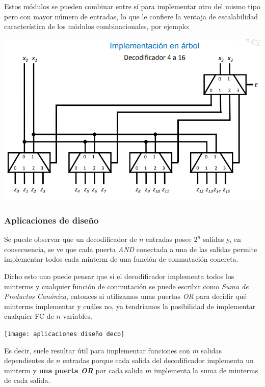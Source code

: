 \documentclass[a4paper,10pt]{book}
\begin{document}
Estos módulos se pueden combinar entre sí para implementar otro del mismo tipo pero con mayor número de entradas, lo que le confiere la ventaja de escalabilidad característica de los módulos combinacionales, por ejemplo:
\begin{center}
\includegraphics[scale=0.65]{Deco16}
\end{center}

\subsubsection*{Aplicaciones de diseño}
Se puede observar que un decodificador de $n$ entradas posee $2^n$ salidas y, en consecuencia, se ve que cada puerta \textit{AND} conectada a una de las salidas permite implementar todos cada minterm de una función de conmutación concreta.\par
Dicho esto uno puede pensar que si el decodificador implementa todos los minterms y cualquier función de conmutación se puede escribir como \textit{Suma de Productos Canónica}, entonces si utilizamos unas puertas \textit{OR} para decidir qué minterms implementar y cuáles no, ya tendríamos la posibilidad de implementar cualquier FC de $n$ variables.

\begin{center}
\texttt{[image: aplicaciones diseño deco]}
\end{center}

Es decir, suele resultar útil para implementar funciones con $m$ salidas dependientes de $n$ entradas porque cada salida del decodificador implementa un minterm y \textbf{una puerta \textit{OR}} por cada salida $m$ implementa la suma de minterms de cada salida.
\end{document}
